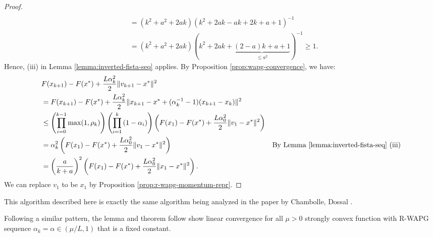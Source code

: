 \documentclass[12pt]{article}
\begin{document}
\begin{proof}
\begin{align*}
            \\
            &= (k^2 + a^2 + 2ak)(k^2 + 2ak - ak + 2k + a + 1)^{-1}
            \\
            &= (k^2 + a^2 + 2ak)(k^2 + 2ak + \underbrace{(2 - a)k + a + 1}_{\le a^2})^{-1} \ge 1.
        \end{align*}
        Hence, (iii) in Lemma \ref{lemma:inverted-fista-seq} applies.
        By Proposition \ref{prop:wapg-convergence}, we have:
        {\small\begin{align*}
            & F(x_{k + 1}) - F(x^*) + \frac{L\alpha_k^2}{2}\Vert v_{k + 1} - x^*\Vert^2
            \\
            & = F(x_{k + 1}) - F(x^*) + \frac{L\alpha_k^2}{2}\Vert x_{k + 1} - x^* + (\alpha_k^{-1} - 1)(x_{k + 1} - x_k)\Vert^2
            \\
            & \le
            \left(
                \prod_{i = 0}^{k - 1} \max(1, \rho_{k})
            \right)
            \left(
                \prod_{i = 1}^{k} \left(1  - \alpha_i\right)
            \right)
            \left(
                F(x_1) - F(x^*) + \frac{L\alpha_0^2}{2}\Vert v_1 - x^*\Vert^2
            \right)
            \\
            &=
            \alpha_k^2
            \left(
                F(x_1) - F(x^*) + \frac{L\alpha_0^2}{2}\Vert v_1 - x^*\Vert^2
            \right)
            & \text{By Lemma \ref{lemma:inverted-fista-seq} (iii)}
            \\
            &=
            \left(\frac{a}{k + a}\right)^2
            \left(
                F(x_1) - F(x^*) + \frac{L\alpha_0^2}{2}\Vert x_1 - x^*\Vert^2
            \right).
        \end{align*}}
        We can replace $v_1$ to be $x_1$ by Proposition \ref{prop:r-wapg-momentum-repr}.
    \end{proof}
    \begin{remark}
        This algorithm described here is exactly the same algorithm being analyzed in the paper by Chambolle, Dossal \cite{chambolle_convergence_2015}.
    \end{remark}
    Following a similar pattern, the lemma and theorem follow show linear convergence for all $\mu > 0$ strongly convex function with R-WAPG sequence $\alpha_k = \alpha \in (\mu/L, 1)$ that is a fixed constant.
\end{document}
